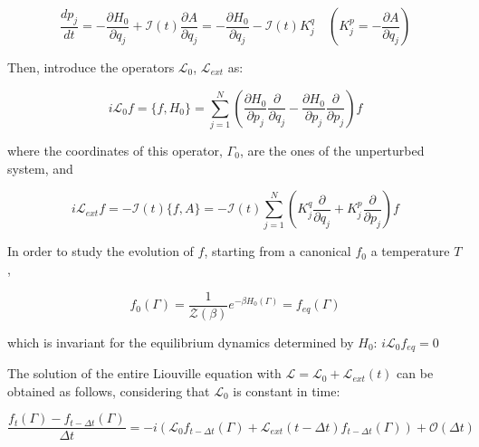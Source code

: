 \documentclass{article}
\begin{document}
$$\frac{d p_j}{ dt } = - \frac{\partial H_0}{ \partial q_j} + \mathcal{I}(t) \frac{\partial A}{\partial q_j} = - \frac{\partial H_0}{ \partial q_j} - \mathcal{I}(t) K^q_j \quad (K_j^p = - \frac{\partial A}{\partial q_j})$$

Then, introduce the operators $\mathcal{L}_0$, $\mathcal{L}_{ext}$ as:

$$ i \mathcal{L}_0 f = \{ f,H_0 \} = \sum_{j=1}^{N} (\frac{\partial H_0}{\partial p_j} \frac{\partial}{\partial q_j} - \frac{\partial H_0}{\partial p_j}  \frac{\partial}{\partial p_j} ) f$$

where the coordinates of this operator, $\Gamma_0$, are the ones of the unperturbed system, and

$$i \mathcal{L}_{ext} f = -\mathcal{I}(t) \{ f , A \} = -\mathcal{I}(t)  \sum_{j=1}^{N} (K_j^q \frac{\partial}{\partial q_j} + K_j^p \frac{\partial}{\partial p_j}) f$$

In order to study the evolution of $f$, starting from a canonical $f_0$ a temperature $T$,

$$ f_0(\Gamma)= \frac{1}{\mathcal{Z}(\beta)} e^{-\beta H_0(\Gamma)} = f_{eq}(\Gamma)$$

which is invariant for the equilibrium dynamics determined by $H_0$: $i \mathcal{L}_0 f_{eq} = 0 $

The solution of the entire Liouville equation with $\mathcal{L} = \mathcal{L}_0 + \mathcal{L}_{ext}(t)$ can be obtained as follows, considering that $ \mathcal{L}_0$ is constant in time:

$$ \frac{ f_t(\Gamma) - f_{t-\Delta t}(\Gamma)}{\Delta t} = -i(\mathcal{L}_0 f_{t-\Delta t} (\Gamma) +  \mathcal{L}_{ext}(t-\Delta t) f_{t-\Delta t} (\Gamma) ) + \mathcal{O}(\Delta t) $$
\end{document}
